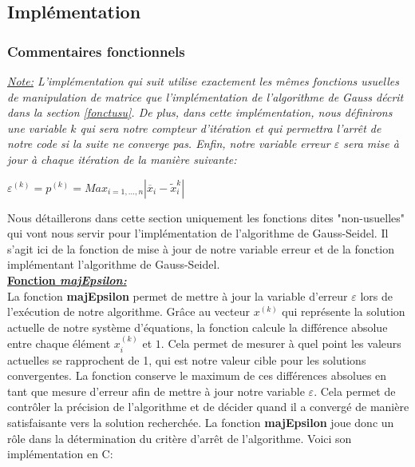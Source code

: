 \subsection{Implémentation}
\subsubsection{Commentaires fonctionnels}
\textit{\underline{Note:} L'implémentation qui suit utilise exactement les mêmes fonctions usuelles de manipulation de matrice que l'implémentation de l'algorithme de Gauss décrit dans la section \ref{fonctusu}. De plus, dans cette implémentation, nous définirons une variable $k$ qui sera notre compteur d'itération et qui permettra l'arrêt de notre code si la suite ne converge pas. Enfin, notre variable erreur $\varepsilon$ sera mise à jour à chaque itération de la manière suivante:\\}
\begin{center}
  $\varepsilon^{(k)}=p^{(k)}=Max_{i=1,...,n}|\overline{x}_i-\widetilde{x}_i^k|$
\end{center}\vspace{8pt}
Nous détaillerons dans cette section uniquement les fonctions dites "non-usuelles" qui vont nous servir pour l'implémentation de l'algorithme de Gauss-Seidel. Il s'agit ici de la fonction de mise à jour de notre variable erreur et de la fonction implémentant l'algorithme de Gauss-Seidel.\vspace{8pt}\\
\textbf{\underline{Fonction \textit{majEpsilon:}}}\vspace{6pt}\\
La fonction \textbf{majEpsilon} permet de mettre à jour la variable d'erreur $\varepsilon$ lors de l'exécution de notre algorithme. Grâce au vecteur $x^{(k)}$ qui représente la solution actuelle de notre système d'équations, la fonction calcule la différence absolue entre chaque élément $x_i^{(k)}$ et $1$. Cela permet de mesurer à quel point les valeurs actuelles se rapprochent de 1, qui est notre valeur cible pour les solutions convergentes. La fonction conserve le maximum de ces différences absolues en tant que mesure d'erreur afin de mettre à jour notre variable $\varepsilon$. Cela permet de contrôler la précision de l'algorithme et de décider quand il a convergé de manière satisfaisante vers la solution recherchée. La fonction \textbf{majEpsilon} joue donc un rôle dans la détermination du critère d'arrêt de l'algorithme. Voici son implémentation en C:

